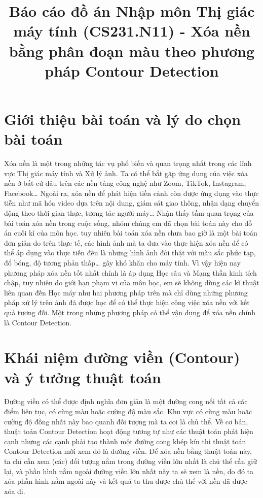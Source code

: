 \documentclass[conference]{IEEEtran}
\begin{document}
\title{Báo cáo đồ án Nhập môn Thị giác máy tính (CS231.N11) - Xóa nền bằng phân đoạn màu theo phương pháp Contour Detection}



\author{
}

\maketitle


\section{Giới thiệu bài toán và lý do chọn bài toán}
Xóa nền là một trong những tác vụ phổ biến và quan trọng nhất trong các lĩnh vực Thị giác máy tính và Xử lý ảnh. Ta có thể bắt gặp ứng dụng của việc xóa nền ở bất cứ đâu trên các nền tảng công nghệ như Zoom, TikTok, Instagram, Facebook… Ngoài ra, xóa nền để phát hiện tiền cảnh còn được ứng dụng vào thực tiễn như mã hóa video dựa trên nội dung, giám sát giao thông, nhận dạng chuyển động theo thời gian thực, tương tác người-máy… Nhận thấy tầm quan  trọng của bài toán xóa nền trong cuộc sống, nhóm chúng em đã chọn bài toán này cho đồ án cuối kì của môn học. tuy nhiên bài toán xóa nền chưa bao giờ là một bài toán đơn giản do trên thực tế, các hình ảnh mà ta đưa vào thực hiện xóa nền để có thể áp dụng vào thực tiễn đều là những hình ảnh đời thật với màu sắc phức tạp, đổ bóng, độ tương phản thấp… gây khó khăn cho máy tính. Vì vậy hiện nay phương pháp xóa nền tốt nhất chính là áp dụng Học sâu và Mạng thần kinh tích chập, tuy nhiên do giới hạn phạm vi của môn học, em sẽ không dùng các kĩ thuật liên quan đến Học máy như hai phương pháp trên mà chỉ dùng những phương pháp xử lý trên ảnh đã được học để có thể thực hiện công việc xóa nền với kết quả tương đối. Một trong những phương pháp có thể vận dụng để xóa nền chính là Contour Detection.
\section{Khái niệm đường viền (Contour) và ý tưởng thuật toán}
Đường viền có thể được định nghĩa đơn giản là một đường cong nối tất cả các điểm liên tục, có cùng màu hoặc cường độ màu sắc. Khu vực có cùng màu hoặc cường độ đồng nhất này bao quanh đối tượng mà ta coi là chủ thể. Về cơ bản, thuật toán Contour Detection hoạt động tương tự như các thuật toán phát hiện cạnh nhưng các cạnh phải tạo thành một đường cong khép kín thì thuật toán Contour Detection mới xem đó là đường viền. Để xóa nền bằng thuật toán này, ta chỉ cần xem (các) đối tượng nằm trong đường viền lớn nhất là chủ thể cần giữ lại, và phần hình nằm ngoài đường viền lớn nhất này ta sẽ xem là nền, do đó ta xóa phần hình nằm ngoài này và kết quả ta thu được chủ thể với nền đã được xóa đi.
\end{document}
